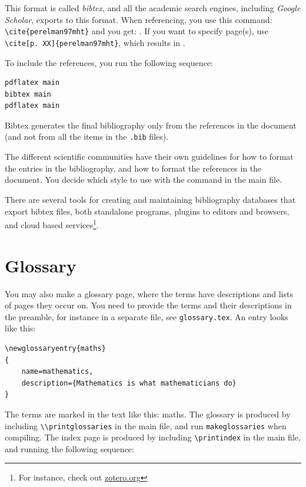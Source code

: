 This format is called  {\em bibtex}, and all the academic search engines, including
 {\em Google Scholar}, exports to this format.
When referencing, you use this command: \verb|\cite{perelman97mht}|
and you get: \cite{perelman97mht}. If you want to specify page(s), use \verb|\cite[p. XX]{perelman97mht}|, which results in \cite[p. XX]{perelman97mht}.
 
 To include the references, you run the following sequence:
 
\begin{lstlisting}[float=!ht]
pdflatex main
bibtex main
pdflatex main
\end{lstlisting}

Bibtex generates the final bibliography only from the references in the document (and not from all the items in the {\tt .bib} files).

The different scientific communities have their own guidelines for how to format the entries in the bibliography, and how to format the references in the document.
You decide which style to use with the command \verb|| in the main file.

There are several tools for creating and maintaining bibliography databases that export bibtex files, both standalone programs, plugins to editors and browsers, and cloud based services\footnote{For instance, check out \url{zotero.org}}.

\section{Glossary}

You may also make a glossary page, where the terms have descriptions and lists of pages they occur on. You need to provide the terms and their descriptions in the preamble, for instance in a separate file, see \verb|glossary.tex|. An entry looks like this:

\begin{lstlisting}[float,float=!h]
\newglossaryentry{maths}
{
    name=mathematics,
    description={Mathematics is what mathematicians do}
}
\end{lstlisting}

The terms are marked in the text like this:  
\gls{maths}. The glossary is produced by including \verb|\\printglossaries| in the main file, and run \verb|makeglossaries| when compiling. The index page is produced by including \verb|\printindex| in the main file, and running the following sequence:

